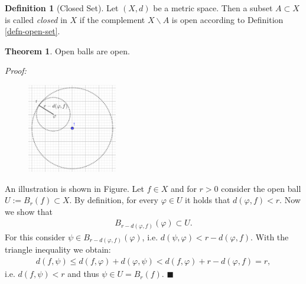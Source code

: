 \documentclass[12pt, a4paper]{article}
\numberwithin{equation}{section}
\theoremstyle{definition}
\theoremstyle{definition}
\newtheorem{defn}[thm]{Definition} %
\newtheorem{theorem}[thm]{Theorem}
\begin{document}
	\begin{defn}[Closed Set]
		Let $(X, d)$ be a metric space. Then a subset $A\subset X$ is called \textit{closed} in $X$ if the complement $X\backslash A$ is open according to Definition \ref{defn-open-set}. 
	\end{defn}

	\begin{theorem}\label{open-balls-open}
		Open balls are open. 
	\end{theorem}
	\noindent\textit{Proof:}
	\begin{figure}[h!]
		\centering
		\includegraphics[width=0.35\textwidth]{Figures/open-balls-open.png}
	\end{figure}
	An illustration is shown in Figure. Let $f\in X$ and for $r > 0$ consider the open ball $U:= B_{r}(f) \subset X$. By definition, for every $\varphi \in U$ it holds that $d\left(\varphi, f\right) < r$. Now we show that 
	\begin{align}
		B_{r-d\left(\varphi, f\right)}(\varphi) \subset U.
	\end{align}
	For this consider $\psi\in B_{r-d\left(\varphi, f\right)}(\varphi)$, i.e. $d(\psi, \varphi) < r - d(\varphi, f)$. With the triangle inequality we obtain: 
	\begin{align}
		d(f, \psi) \leq d(f, \varphi) + d(\varphi, \psi) < d(f, \varphi) + r - d(\varphi, f) = r,  		
	\end{align}
	i.e. $d(f, \psi) < r$ and thus $\psi\in U = B_{r}(f)$.  \qquad\qquad\qquad\qquad\qquad\qquad\qquad\qquad\qquad\qquad\qquad\qquad\qquad\quad$\blacksquare$
	
\end{document}
